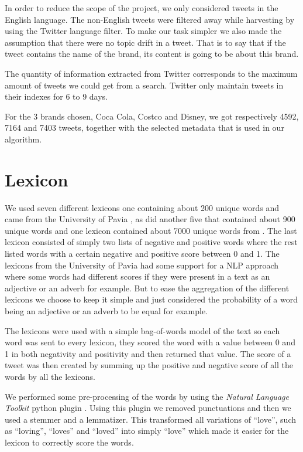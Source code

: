 \documentclass[a4paper,12pt]{report}
\begin{document}
In order to reduce the scope of the project, we only considered tweets in the English language. 
The non-English tweets were filtered away while harvesting by using the Twitter language filter.
To make our task simpler we also made the assumption that there were no topic drift in a tweet. 
That is to say that if the tweet contains the name of the brand, its content is going to be about this brand.

The quantity of information extracted from Twitter corresponds to the maximum amount of tweets we could get from a search.
Twitter only maintain tweets in their indexes for 6 to 9 days.\cite{Twitter}

For the 3 brands chosen, Coca Cola, Costco and Disney, we got respectively 4592, 7164 and 7403 tweets, together with the selected metadata that is used in our algorithm.

\section{Lexicon}

We used seven different lexicons one containing about 200 unique words and came from the University of Pavia \cite{WNOP07}, as did another five that contained about 900 unique words and one lexicon contained about 7000 unique words from \cite{Liu04}. 
The last lexicon consisted of simply two lists of negative and positive words where the rest listed words with a certain negative and positive score between 0 and 1. 
The lexicons from the University of Pavia had some support for a NLP approach where some words had different scores if they were present in a text as an adjective or an adverb for example.  
But to ease the aggregation of the different lexicons we choose to keep it simple and just considered the probability of a word being an adjective or an adverb to be equal for example.

The lexicons were used with a simple bag-of-words model of the text so each word was sent to every lexicon, they scored the word with a value between 0 and 1 in both negativity and positivity and then returned that value. 
The score of a tweet was then created by summing up the positive and negative score of all the words by all the lexicons.

We performed some pre-processing of the words by using the \textit{Natural Language Toolkit} python plugin \cite{NLTK}.
Using this plugin we removed punctuations and then we used a stemmer and a lemmatizer. This transformed all variations of ``love'', such as ``loving'', ``loves'' and ``loved'' into simply ``love'' which made it easier for the lexicon to correctly score the words.
\end{document}
